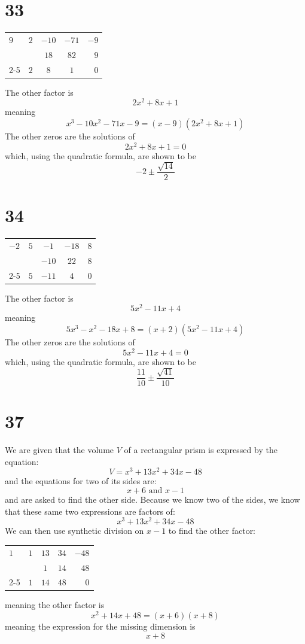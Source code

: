 \documentclass{article}
\theoremstyle{definition}
\begin{document}
\newpage
\section*{33}
\FloatBarrier
	\begin{center}
		\begin{tabular}{l|cccr}
			$9$ & $2$ & $-10$ & $-71$ & $-9$ \\
			& & $18$ & $82$ & $9$ \\[-4.75pt]
			\cmidrule{2-5}
			& $2$ & $8$ & $1$ & $0$
		\end{tabular}
	\end{center}
\FloatBarrier
The other factor is \[ 2x^2+8x+1 \]
meaning \[ x^3-10x^2-71x-9=(x-9)(2x^2+8x+1) \]
The other zeros are the solutions of \[ 2x^2+8x+1=0 \] which, using the quadratic formula, are shown to be 
\[ -2\pm\frac{\sqrt{14}}{2} \]

\section*{34}
\FloatBarrier
	\begin{center}
		\begin{tabular}{l|cccr}
			$-2$ & $5$ & $-1$ & $-18$ & $8$ \\
			& & $-10$ & $22$ & $8$ \\[-4.75pt]
			\cmidrule{2-5}
			& $5$ & $-11$ & $4$ & $0$
		\end{tabular}
	\end{center}
\FloatBarrier
The other factor is \[ 5x^2-11x+4 \]
meaning \[ 5x^3-x^2-18x+8=(x+2)(5x^2-11x+4) \]
The other zeros are the solutions of \[ 5x^2-11x+4=0 \] which, using the quadratic formula, are shown to be 
\[ \frac{11}{10}\pm\frac{\sqrt{41}}{10} \]

\section*{37}
We are given that the volume $V$ of a rectangular prism is expressed by the equation:
\[ V=x^3+13x^2+34x-48 \]
and the equations for two of its sides are:
\[ x+6\textrm{ and } x-1 \]
and are asked to find the other side. Because we know two of the sides, we know that these same two expressions are factors of:
\[ x^3+13x^2+34x-48 \]
We can then use synthetic division on $x-1$ to find the other factor:
\FloatBarrier
	\begin{center}
		\begin{tabular}{l|cccr}
			$1$ & $1$ & $13$ & $34$ & $-48$ \\
			& & $1$ & $14$ & $48$ \\[-4.75pt]
			\cmidrule{2-5}
			& $1$ & $14$ & $48$ & $0$
		\end{tabular}
	\end{center}
\FloatBarrier
meaning the other factor is
\[ x^2+14x+48=(x+6)(x+8) \]
meaning the expression for the missing dimension is
\[ x+8 \]
\end{document}
